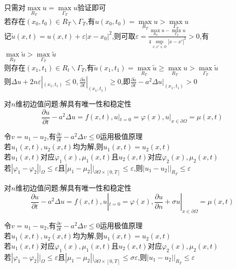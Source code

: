 \begin{jie}
只需对$\max\limits_{R_T}u=\max\limits_{\Gamma_T}u$验证即可\\
若存在$(x_0,t_0)\in R_T\backslash \Gamma_T$,有$u(x_0,t_0)=\max\limits_{R_T}u>\max\limits_{\Gamma_T}u$\\
记$\widetilde{u}(x,t)=u(x,t)+\varepsilon|x-x_0|^2$,则可取$\varepsilon=\frac{\max\limits_{R_{T}}u-\max\limits_{\Gamma_{T}}u}{4\sup\limits_{x,x'\in\Omega}|x-x'|^2}>0$,有$\max\limits_{R_T}\widetilde{u}>\max\limits_{\Gamma_T}\widetilde{u}$\\
则存在$(x_1,t_1)\in R_t\backslash \Gamma_T$,有$\widetilde{u}(x_1,t_1)=\max\limits_{R_T}\widetilde{u}\geq\max\limits_{R_{T}}u>\max\limits_{\Gamma_{T}}\widetilde{u}$\\
则$\Delta u+2n\varepsilon|_{(x_1,t_1)}\leq 0,\frac{\partial \widetilde{u}}{\partial t}|_{(x_1,t_1)}\geq 0$,即$\frac{\partial \widetilde{u}}{\partial t}-a^2\Delta u|_{(x_1,t_1)}>0$
\end{jie}

\begin{dingli*}
对$n$维初边值问题:解具有唯一性和稳定性
\[\frac{\partial u}{\partial t}-a^2\Delta u=f(x,t),u|_{t=0}=\varphi(x),u|_{x\in\partial\Omega}=\mu(x,t)\]
\end{dingli*}

\begin{jie}
令$v=u_1-u_2$,有$\frac{\partial v}{\partial t}-a^2\Delta v\leq 0$运用极值原理\\
若$u_1(x,t),u_2(x,t)$均为解,则$u_1(x,t)=u_2(x,t)$\\
若$u_1(x,t)$对应$\varphi_1(x),\mu_1(x,t)$且$u_2(x,t)$对应$\varphi_2(x),\mu_2(x,t)$\\
若$|\varphi_1-\varphi_2|\Big|_{\Omega}\leq \varepsilon$且$|\mu_1-\mu_2|\Big|_{\partial \Omega \times [0,T]}\leq \varepsilon$,则$|u_1-u_2|\Big|_{R_T}\leq \varepsilon$
\end{jie}

\begin{dingli*}
对$n$维初边值问题:解具有唯一性和稳定性
\[\frac{\partial u}{\partial t}-a^2\Delta u=f(x,t),u|_{t=0}=\varphi(x),\frac{\partial u}{\partial n}+\sigma u|_{x\in\partial\Omega}=\mu(x,t)\]
\end{dingli*}

\begin{jie}
令$v=u_1-u_2$,有$\frac{\partial v}{\partial t}-a^2\Delta v\leq 0$运用极值原理\\
若$u_1(x,t),u_2(x,t)$均为解,则$u_1(x,t)=u_2(x,t)$\\
若$u_1(x,t)$对应$\varphi_1(x),\mu_1(x,t)$且$u_2(x,t)$对应$\varphi_2(x),\mu_2(x,t)$\\
若$|\varphi_1-\varphi_2|\Big|_{\Omega}\leq \varepsilon$且$|\mu_1-\mu_2|\Big|_{\partial \Omega \times [0,T]}\leq \sigma\varepsilon$,则$|u_1-u_2|\Big|_{R_T}\leq \varepsilon$
\end{jie}


